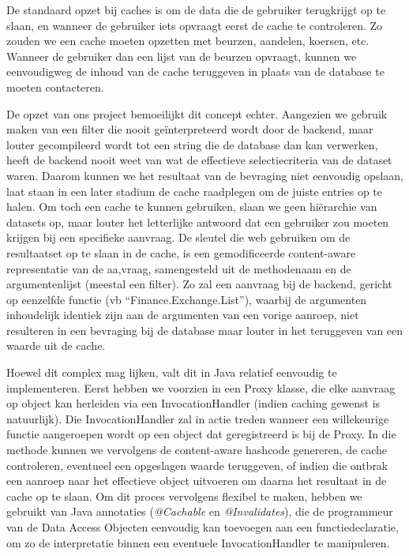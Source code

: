 De standaard opzet bij caches is om de data die de gebruiker terugkrijgt op te slaan, en wanneer de gebruiker iets opvraagt eerst de cache te controleren. Zo zouden we een cache moeten opzetten met beurzen, aandelen, koersen, etc. Wanneer de gebruiker dan een lijst van de beurzen opvraagt, kunnen we eenvoudigweg de inhoud van de cache teruggeven in plaats van de database te moeten contacteren.

De opzet van ons project bemoeilijkt dit concept echter. Aangezien we gebruik maken van een filter die nooit ge\"interpreteerd wordt door de backend, maar louter gecompileerd wordt tot een string die de database dan kan verwerken, heeft de backend nooit weet van wat de effectieve selectiecriteria van de dataset waren. Daarom kunnen we het resultaat van de bevraging niet eenvoudig opslaan, laat staan in een later stadium de cache raadplegen om de juiste entries op te halen.
Om toch een cache te kunnen gebruiken, slaan we geen hi\"erarchie van datasets op, maar louter het letterlijke antwoord dat een gebruiker zou moeten krijgen bij een specifieke aanvraag. De sleutel die web gebruiken om de resultaatset op te slaan in de cache, is een gemodificeerde content-aware representatie van de aa,vraag, samengesteld uit de methodenaam en de argumentenlijst (meestal een filter). Zo zal een aanvraag bij de backend, gericht op eenzelfde functie (vb ``Finance.Exchange.List''), waarbij de argumenten inhoudelijk identiek zijn aan de argumenten van een vorige aanroep, niet resulteren in een bevraging bij de database maar louter in het teruggeven van een waarde uit de cache.

Hoewel dit complex mag lijken, valt dit in Java relatief eenvoudig te implementeren. Eerst hebben we voorzien in een Proxy klasse, die elke aanvraag op object kan herleiden via een InvocationHandler (indien caching gewenst is natuurlijk). Die InvocationHandler zal in actie treden wanneer een willekeurige functie aangeroepen wordt op een object dat geregistreerd is bij de Proxy. In die methode kunnen we vervolgens de content-aware hashcode genereren, de cache controleren, eventueel een opgeslagen waarde teruggeven, of indien die ontbrak een aanroep naar het effectieve object uitvoeren om daarna het resultaat in de cache op te slaan.
Om dit proces vervolgens flexibel te maken, hebben we gebruikt van Java annotaties (\emph{@Cachable} en \emph{@Invalidates}), die de programmeur van de Data Access Objecten eenvoudig kan toevoegen aan een functiedeclaratie, om zo de interpretatie binnen een eventuele InvocationHandler te manipuleren.

